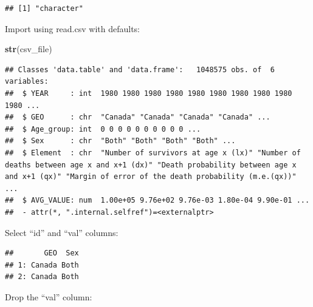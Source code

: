 \documentclass[]{book}
\newenvironment{Shaded}{\begin{snugshade}}{\end{snugshade}}
\newcommand{\DataTypeTok}[1]{\textcolor[rgb]{0.13,0.29,0.53}{#1}}
\newcommand{\DecValTok}[1]{\textcolor[rgb]{0.00,0.00,0.81}{#1}}
\newcommand{\KeywordTok}[1]{\textcolor[rgb]{0.13,0.29,0.53}{\textbf{#1}}}
\newcommand{\NormalTok}[1]{#1}
\newcommand{\OperatorTok}[1]{\textcolor[rgb]{0.81,0.36,0.00}{\textbf{#1}}}
\newcommand{\StringTok}[1]{\textcolor[rgb]{0.31,0.60,0.02}{#1}}
\begin{document}
\begin{verbatim}
## [1] "character"
\end{verbatim}

Import using read.csv with defaults:

\begin{Shaded}
\begin{Highlighting}[]
\KeywordTok{str}\NormalTok{(csv_file)}
\end{Highlighting}
\end{Shaded}

\begin{verbatim}
## Classes 'data.table' and 'data.frame':	1048575 obs. of  6 variables:
##  $ YEAR     : int  1980 1980 1980 1980 1980 1980 1980 1980 1980 1980 ...
##  $ GEO      : chr  "Canada" "Canada" "Canada" "Canada" ...
##  $ Age_group: int  0 0 0 0 0 0 0 0 0 0 ...
##  $ Sex      : chr  "Both" "Both" "Both" "Both" ...
##  $ Element  : chr  "Number of survivors at age x (lx)" "Number of deaths between age x and x+1 (dx)" "Death probability between age x and x+1 (qx)" "Margin of error of the death probability (m.e.(qx))" ...
##  $ AVG_VALUE: num  1.00e+05 9.76e+02 9.76e-03 1.80e-04 9.90e-01 ...
##  - attr(*, ".internal.selfref")=<externalptr>
\end{verbatim}

Select ``id'' and ``val'' columns:

\begin{Shaded}
\end{Shaded}

\begin{verbatim}
##       GEO  Sex
## 1: Canada Both
## 2: Canada Both
\end{verbatim}

Drop the ``val'' column:

\begin{Shaded}
\end{Shaded}
\end{document}
